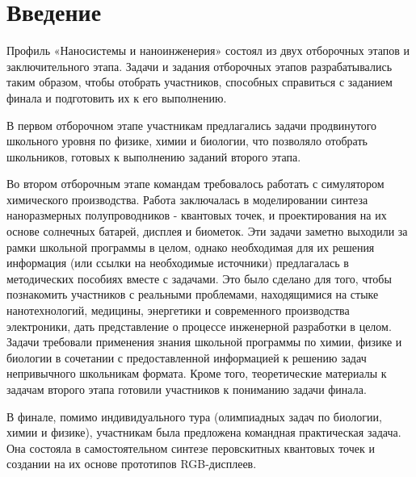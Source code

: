 %
\begingroup
\pagestyle{empty}

\section*{Введение}

Профиль «Наносистемы и наноинженерия» состоял из двух отборочных этапов и заключительного этапа. Задачи и задания отборочных этапов разрабатывались таким образом, чтобы отобрать участников, способных справиться с заданием финала и подготовить их к его выполнению. 

В первом отборочном этапе участникам предлагались задачи продвинутого школьного уровня по физике, химии и биологии, что позволяло отобрать школьников, готовых к выполнению заданий второго этапа. 

Во втором отборочным этапе командам требовалось работать с симулятором химического производства. Работа заключалась в моделировании синтеза наноразмерных полупроводников - квантовых точек, и проектирования на их основе солнечных батарей, дисплея и биометок. Эти задачи заметно выходили за рамки школьной программы в целом, однако необходимая для их решения информация (или ссылки на необходимые источники) предлагалась в методических пособиях вместе с задачами. Это было сделано для того, чтобы познакомить участников с реальными проблемами, находящимися на стыке нанотехнологий, медицины, энергетики и современного производства электроники, дать представление о процессе инженерной разработки в целом. Задачи требовали применения знания школьной программы по химии, физике и биологии в сочетании с предоставленной информацией к решению задач непривычного школьникам формата. Кроме того, теоретические материалы к задачам второго этапа готовили участников к пониманию задачи финала. 

В финале, помимо индивидуального тура (олимпиадных задач по биологии, химии и физике), участникам была предложена командная практическая задача. Она состояла в самостоятельном синтезе перовскитных квантовых точек и создании на их основе прототипов RGB-дисплеев. 

